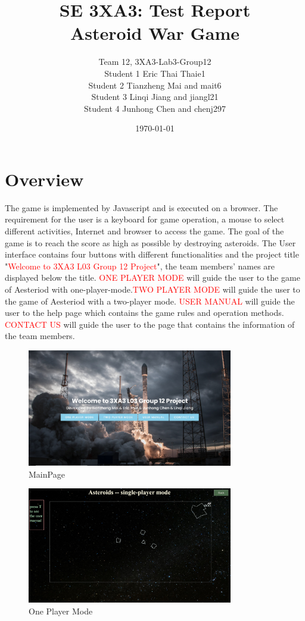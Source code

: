 \documentclass[12pt, titlepage]{article}
\title{SE 3XA3: Test Report\\Asteroid War Game}
\author{Team 12, 3XA3-Lab3-Group12
		\\ Student 1 Eric Thai Thaie1
		\\ Student 2 Tianzheng Mai and mait6
		\\ Student 3 Linqi Jiang and jiangl21
		\\ Student 4 Junhong Chen and chenj297
}
\date{\today}
\begin{document}
\maketitle
\section* {Overview}
The game is implemented by Javascript and is executed on a browser. The requirement for the user is a keyboard for game operation, a mouse to select different activities, Internet and browser to access the game. The goal of the game is to reach the score as high as possible by destroying asteroids. The User interface contains four buttons with different functionalities and the project title "\textcolor{red}{Welcome to 3XA3 L03 Group 12 Project}", the team members' names are displayed below the title. \textcolor{red}{ONE PLAYER MODE} will guide the user to the game of Aesteriod with one-player-mode.\textcolor{red}{TWO PLAYER MODE} will guide the user to the game of Aesteriod with a two-player mode. \textcolor{red}{USER MANUAL} will guide the user to the help page which contains the game rules and operation methods. \textcolor{red}{CONTACT US} will guide the user to the page that contains the information of the team members.

\begin{figure}[!h]
\begin{center}
\includegraphics[width=0.8\textwidth]{MainPage.jpg}
\end{center}
\caption{MainPage}
\label{fig:Main_Pager}
\end{figure}

\begin{figure}[!h]
\begin{center}
\includegraphics[width=0.8\textwidth]{One_Player_Mode.jpg}
\end{center}
\caption{One Player Mode}
\label{fig:single_Player}
\end{figure}
\end{document}
